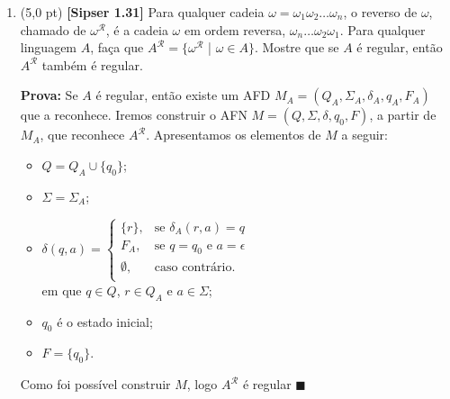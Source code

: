 \documentclass[12pt,a4paper,oneside]{article}
\begin{document}
\begin{enumerate}
	\item (5,0 pt) {\bf [Sipser 1.31]} Para qualquer cadeia $\omega = \omega_1 \omega_2 \ldots \omega_n$, o reverso de $\omega$, chamado de $\omega^{\mathcal{R}}$, é a cadeia $\omega$ em ordem reversa, $\omega_n \ldots \omega_2 \omega_1$. Para qualquer linguagem $A$, faça que $A^{\mathcal{R}} = \{ \omega^{\mathcal{R}}$ | $\omega \in A\}$. Mostre que se $A$ é regular, então $A^{\mathcal{R}}$ também é regular.
	
	\vspace*{0.3cm}
	
	{\color{blue}
		{\bf Prova:} Se $A$ é regular, então existe um AFD $M_A = (Q_A, \Sigma_A, \delta_A, q_A, F_A)$ que a reconhece. Iremos construir o AFN $M = (Q, \Sigma, \delta, q_0, F)$, a partir de $M_A$, que reconhece $A^\mathcal{R}$. Apresentamos os elementos de $M$ a seguir:
			\begin{itemize}
				\item $Q = Q_A \cup \{q_0\}$;
				\item $\Sigma = \Sigma_A$;
				\item $\delta(q,a) = \left\{\begin{array}{rl}
				\{r\}, 		& \text{se } \delta_A(r,a) = q\\
				F_A, 			& \text{se } q=q_0 \text{ e } a=\epsilon\\
				\emptyset, 			& \text{caso contrário.}\\
				\end{array} \right.$\\
				em que $q \in Q$, $r \in Q_A$ e $a \in \Sigma$;
				\item $q_0$ é o estado inicial;
				\item $F = \{q_0\}$.
			\end{itemize}
		Como foi possível construir $M$, logo $A^\mathcal{R}$ é regular $\blacksquare$
	}

\end{enumerate}
\end{document}
